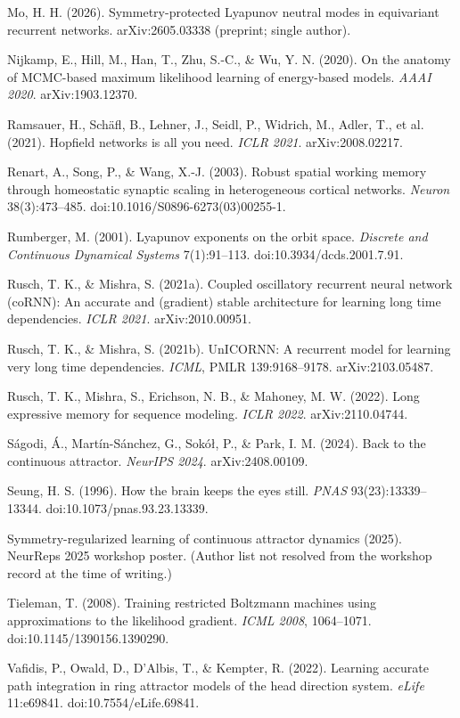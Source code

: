 \documentclass{article}
\begin{document}
{Mo, H. H. (2026). Symmetry-protected Lyapunov neutral modes in equivariant recurrent networks. arXiv:2605.03338 (preprint; single author).\par
Nijkamp, E., Hill, M., Han, T., Zhu, S.-C., \& Wu, Y. N. (2020). On the anatomy of MCMC-based maximum likelihood learning of energy-based models. \emph{AAAI 2020}. arXiv:1903.12370.\par
Ramsauer, H., Sch\"afl, B., Lehner, J., Seidl, P., Widrich, M., Adler, T., et al. (2021). Hopfield networks is all you need. \emph{ICLR 2021}. arXiv:2008.02217.\par
Renart, A., Song, P., \& Wang, X.-J. (2003). Robust spatial working memory through homeostatic synaptic scaling in heterogeneous cortical networks. \emph{Neuron} 38(3):473--485. doi:10.1016/S0896-6273(03)00255-1.\par
Rumberger, M. (2001). Lyapunov exponents on the orbit space. \emph{Discrete and Continuous Dynamical Systems} 7(1):91--113. doi:10.3934/dcds.2001.7.91.\par
Rusch, T. K., \& Mishra, S. (2021a). Coupled oscillatory recurrent neural network (coRNN): An accurate and (gradient) stable architecture for learning long time dependencies. \emph{ICLR 2021}. arXiv:2010.00951.\par
Rusch, T. K., \& Mishra, S. (2021b). UnICORNN: A recurrent model for learning very long time dependencies. \emph{ICML}, PMLR 139:9168--9178. arXiv:2103.05487.\par
Rusch, T. K., Mishra, S., Erichson, N. B., \& Mahoney, M. W. (2022). Long expressive memory for sequence modeling. \emph{ICLR 2022}. arXiv:2110.04744.\par
S\'agodi, \'A., Mart\'in-S\'anchez, G., Sokó\l, P., \& Park, I. M. (2024). Back to the continuous attractor. \emph{NeurIPS 2024}. arXiv:2408.00109.\par
Seung, H. S. (1996). How the brain keeps the eyes still. \emph{PNAS} 93(23):13339--13344. doi:10.1073/pnas.93.23.13339.\par
Symmetry-regularized learning of continuous attractor dynamics (2025). NeurReps 2025 workshop poster. (Author list not resolved from the workshop record at the time of writing.)\par
Tieleman, T. (2008). Training restricted Boltzmann machines using approximations to the likelihood gradient. \emph{ICML 2008}, 1064--1071. doi:10.1145/1390156.1390290.\par
Vafidis, P., Owald, D., D'Albis, T., \& Kempter, R. (2022). Learning accurate path integration in ring attractor models of the head direction system. \emph{eLife} 11:e69841. doi:10.7554/eLife.69841.\par
}
\end{document}
